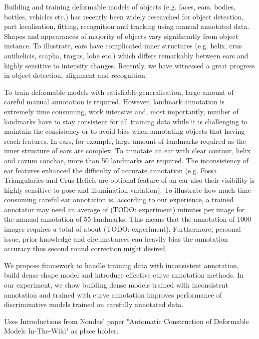 Building and training deformable models of objects (e.g. faces, ears, bodies, bottles, vehicles etc.) has recently been widely researched for object detection, part localisation, fitting, recognition and tracking using manual annotated data. Shapes and appearances of majority of objects vary significantly from object instance. To illustrate, ears have complicated inner structures (e.g. helix, crus antihelicis, scapha, tragus, lobe etc.) which differs remarkably between ears and highly sensitive to intensity changes. Recently, we have witnessed a great
progress in object detection, alignment and recognition. 

To train deformable models with satisfiable generalisation, large amount of careful manual annotation is required. However, landmark annotation is extremely time consuming, work intensive and, most importantly, number of landmarks have to stay consistent for all training data while it is challenging to maintain the consistency or to avoid bias when annotating objects that having reach features. In ears, for example, large amount of landmarks required as the inner structure of ears are complex. To annotate an ear with clear contour, helix and cavum conchae, more than 50 landmarks are required. The inconsistency of ear features enhanced the difficulty of accurate annotation (e.g. Fossa Triangularies and Crus Helicis are optional feature of an ear also their visibility is highly sensitive to pose and illumination variation).
To illustrate how much time consuming careful ear annotation is, according to our experience, a trained annotator may need an average of (TODO: experiment) minutes per image for the manual annotation of 55 landmarks. This means that the annotation of 1000 images requires a total of about (TODO: experiment). Furthermore, personal issue, prior knowledge and circumstances can heavily bias the annotation accuracy thus second round correction might desired.

We propose framework to handle training data with inconsistent annotation, build dense shape model and introduce effective curve annotation methods. In our experiment, we show building dense models trained with inconsistent annotation and trained with curve annotation improves performance of discriminative models trained on carefully annotated data.

Uses Introductions from Nondas' paper "Automatic Construction of Deformable Models In-The-Wild" as place holder.

